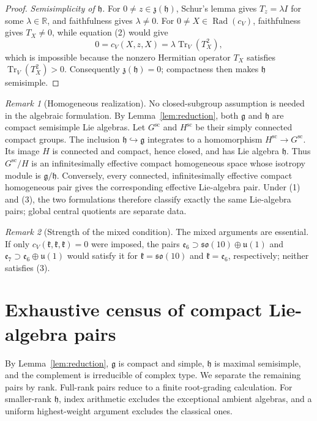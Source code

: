 \documentclass[11pt]{article}
\theoremstyle{remark}
\newtheorem*{remark}{Remark}
\newcommand{\g}{\mathfrak g}
\newcommand{\h}{\mathfrak h}
\newcommand{\e}{\mathfrak e}
\newcommand{\soalg}{\mathfrak{so}}
\newcommand{\Tr}{\operatorname{Tr}}
\newcommand{\Rad}{\operatorname{Rad}}
\begin{document}
\begin{proof}
\emph{Semisimplicity of \(\h\).}
For \(0\ne z\in\mathfrak z(\h)\), Schur's lemma gives
\(T_z=\lambda I\) for some \(\lambda\in\mathbb R\), and faithfulness
gives \(\lambda\ne0\). For \(0\ne X\in\Rad(c_V)\), faithfulness gives
\(T_X\ne0\), while equation (2) would give
\[
0=c_V(X,z,X)=\lambda\Tr_V(T_X^2),
\]
which is impossible because the nonzero Hermitian operator \(T_X\)
satisfies \(\Tr_V(T_X^2)>0\). Consequently \(\mathfrak z(\h)=0\); compactness then makes \(\h\)
semisimple.
\end{proof}

\begin{remark}[Homogeneous realization]
No closed-subgroup assumption is needed in the algebraic formulation.
By Lemma~\ref{lem:reduction}, both \(\g\) and \(\h\) are compact
semisimple Lie algebras. Let \(G^{\mathrm{sc}}\) and
\(H^{\mathrm{sc}}\) be their simply connected compact groups.
The inclusion \(\h\hookrightarrow\g\) integrates to a homomorphism
\(H^{\mathrm{sc}}\to G^{\mathrm{sc}}\). Its image \(H\) is connected
and compact, hence closed, and has Lie algebra \(\h\). Thus
\(G^{\mathrm{sc}}/H\) is an infinitesimally effective compact homogeneous
space whose isotropy module is \(\g/\h\). Conversely, every connected,
infinitesimally effective compact homogeneous pair gives the corresponding
effective Lie-algebra pair. Under (1) and (3), the two formulations
therefore classify exactly the same Lie-algebra pairs; global central
quotients are separate data.
\end{remark}

\begin{remark}[Strength of the mixed condition]
The mixed arguments are essential. If only
\(c_V(\mathfrak k,\mathfrak k,\mathfrak k)=0\) were imposed, the pairs
\(\e_6\supset\soalg(10)\oplus\mathfrak u(1)\) and
\(\e_7\supset\e_6\oplus\mathfrak u(1)\) would satisfy it for
\(\mathfrak k=\soalg(10)\) and \(\mathfrak k=\e_6\), respectively;
neither satisfies (3).
\end{remark}

\section{Exhaustive census of compact Lie-algebra pairs}

By Lemma~\ref{lem:reduction}, \(\g\) is compact and simple, \(\h\) is
maximal semisimple, and the complement is irreducible of complex type.
We separate the remaining pairs by rank. Full-rank pairs reduce to a finite
root-grading calculation. For smaller-rank \(\h\), index arithmetic excludes
the exceptional ambient algebras, and a uniform highest-weight argument
excludes the classical ones.
\end{document}
